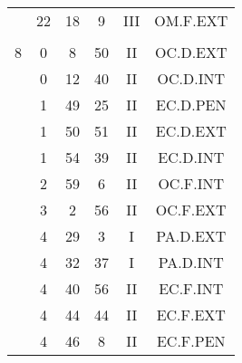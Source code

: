 \documentclass[12pt, a4paper]{article}
\begin{document}
\begin{multicols}{3}
{\begin{tabular}{c c c c c c}
	 	 	 	 & 22 & 18 & 9 & III & OM.F.EXT\\%
	 	 	 	 & & & & & \\%
	 	 	 	8 & 0 & 8 & 50 & II & OC.D.EXT\\%
	 	 	 	 & 0 & 12 & 40 & II & OC.D.INT\\%
	 	 	 	 & 1 & 49 & 25 & II & EC.D.PEN\\%
	 	 	 	 & 1 & 50 & 51 & II & EC.D.EXT\\%
	 	 	 	 & 1 & 54 & 39 & II & EC.D.INT\\%
	 	 	 	 & 2 & 59 & 6 & II & OC.F.INT\\%
	 	 	 	 & 3 & 2 & 56 & II & OC.F.EXT\\%
	 	 	 	 & 4 & 29 & 3 & I & PA.D.EXT\\%
	 	 	 	 & 4 & 32 & 37 & I & PA.D.INT\\%
	 	 	 	 & 4 & 40 & 56 & II & EC.F.INT\\%
	 	 	 	 & 4 & 44 & 44 & II & EC.F.EXT\\%
	 	 	 	 & 4 & 46 & 8 & II & EC.F.PEN\\%
	 	 \end{tabular}
 	}
\end{multicols}
\end{document}
